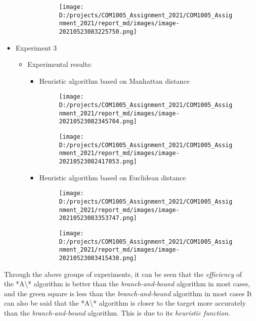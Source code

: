 \documentclass[
]{article}
\begin{document}
\begin{itemize}
\begin{itemize}
\begin{itemize}
      \begin{figure}
      \centering
      \texttt{[image: D:/projects/COM1005\_Assignment\_2021/COM1005\_Assignment\_2021/report\_md/images/image-20210523083225750.png]}
      \caption{}
      \end{figure}
    \end{itemize}
  \end{itemize}
\item
  Experiment 3

  \begin{itemize}
  \item
    Experimental results:

    \begin{itemize}
    \item
      Heuristic algorithm based on Manhattan distance

      \begin{figure}
      \centering
      \texttt{[image: D:/projects/COM1005\_Assignment\_2021/COM1005\_Assignment\_2021/report\_md/images/image-20210523082345704.png]}
      \caption{}
      \end{figure}

      \begin{figure}
      \centering
      \texttt{[image: D:/projects/COM1005\_Assignment\_2021/COM1005\_Assignment\_2021/report\_md/images/image-20210523082417053.png]}
      \caption{}
      \end{figure}
    \item
      Heuristic algorithm based on Euclidean distance

      \begin{figure}
      \centering
      \texttt{[image: D:/projects/COM1005\_Assignment\_2021/COM1005\_Assignment\_2021/report\_md/images/image-20210523083353747.png]}
      \caption{}
      \end{figure}

      \begin{figure}
      \centering
      \texttt{[image: D:/projects/COM1005\_Assignment\_2021/COM1005\_Assignment\_2021/report\_md/images/image-20210523083415438.png]}
      \caption{}
      \end{figure}
    \end{itemize}
  \end{itemize}
\end{itemize}

Through the above groups of experiments, it can be seen that the
\emph{efficiency} of the *A\textbackslash** algorithm is better than the
\emph{branch-and-bound} algorithm in most cases, and the green square is
less than the \emph{branch-and-bound} algorithm in most cases It can
also be said that the *A\textbackslash** algorithm is closer to the
target more accurately than the \emph{branch-and-bound} algorithm. This
is due to its \emph{heuristic function}.
\end{document}
